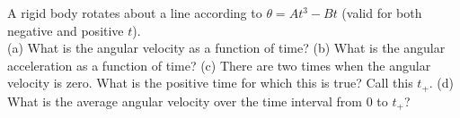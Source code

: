 A rigid body rotates about a line according to
$\theta = At^3-Bt$ (valid for both
negative and positive $t$).\\
%
(a) What is the angular velocity as a function of time?\answercheck\hwendpart
%
(b) What is the angular acceleration as a function of time?\answercheck\hwendpart
%
(c) There are two times when the angular velocity is zero. What is the
positive time for which this is true? Call this $t_+$.\answercheck\hwendpart
%
(d) What is the average angular velocity over the time interval
from 0 to $t_+$?\answercheck
